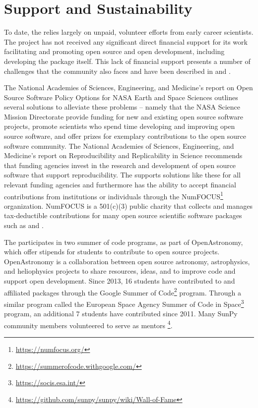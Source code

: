 \section{Support and Sustainability}
\label{sec:support}

To date, the \sunpyproj relies largely on unpaid, volunteer efforts from early career scientists.
The project has not received any significant direct financial support for its work facilitating and promoting open source and open development, including developing the \sunpypkg package itself.
This lack of financial support presents a number of challenges that the \astropy community also faces and have been described in \cite{PriceWhelan:2018ji} and \cite{Muna2016}.

The National Academies of Sciences, Engineering, and Medicine's report on Open Source Software Policy Options for NASA Earth and Space Sciences \citep{NAP2018} outlines several solutions to alleviate these problems -- namely that the NASA Science Mission Directorate provide funding for new and existing open source software projects, promote scientists who spend time developing and improving open source software, and offer prizes for exemplary contributions to the open source software community.
The National Academies of Sciences, Engineering, and Medicine's report on Reproducibility and Replicability in Science \citep{NAP2019} recommends that funding agencies invest in the research and development of open source software that support reproducibility.
The \sunpyproj supports solutions like these for all relevant funding agencies \citep{nas_sunpy_white_paper} and furthermore has the ability to accept financial contributions from institutions or individuals through the NumFOCUS\footnote{\url{https://numfocus.org/}} organization. NumFOCUS is a 501(c)(3) public charity that collects and manages tax-deductible contributions for many open source scientific software packages such as \numpy and \astropy.

The \sunpyproj participates in two summer of code programs, as part of OpenAstronomy, which offer stipends for students to contribute to open source projects. OpenAstronomy is a collaboration between open source astronomy, astrophysics, and heliophysics projects to share resources, ideas, and to improve code and support open development.
Since 2013, 16 students have contributed to \sunpypkg and affiliated packages through the Google Summer of Code\footnote{\url{https://summerofcode.withgoogle.com/}} program.
Through a similar program called the European Space Agency Summer of Code in Space\footnote{\url{https://socis.esa.int/}} program, an additional 7 students have contributed since 2011.
Many SunPy community members volunteered to serve as mentors \footnote{\url{https://github.com/sunpy/sunpy/wiki/Wall-of-Fame}}.
